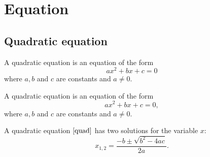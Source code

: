 \chapter{Equation}
\section{Quadratic equation}
\begin{dfn}
  A quadratic equation is an equation of the form
  \begin{equation}
    \label{eq:quad}
    ax^2 + bx + c = 0
  \end{equation}
  where \( a, b \) and \( c \) are constants and \( a \neq 0 \).
\end{dfn}
\begin{dfn}                     %
  A quadratic equation is an equation of the form
  \begin{equation}
    \label{quad}
    ax^2 + bx + c = 0,
  \end{equation}
  where \( a, b \) and \( c \) are constants and \( a \neq 0 \).
\end{dfn}

\begin{thm}                     %
  A quadratic equation \(\ref{quad}\) has two solutions for the variable
  \( x \):
  \begin{equation}
    \label{root}
    x_{1,2} = \frac{-b \pm \sqrt{b^2-4ac}}{2a}.
  \end{equation}
\end{thm}

